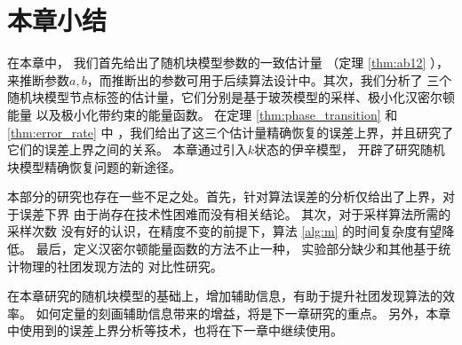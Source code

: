 

\section{本章小结}\label{sec:summary_potts}
在本章中， 
我们首先给出了随机块模型参数的一致估计量 （定理 \ref{thm:ab12} ），
来推断参数$a,b$，而推断出的参数可用于后续算法设计中。其次，我们分析了
三个随机块模型节点标签的估计量，它们分别是基于玻茨模型的采样、极小化汉密尔顿能量
以及极小化带约束的能量函数。
在定理 \ref{thm:phase_transition} 和 \ref{thm:error_rate} 中
，我们给出了这三个估计量精确恢复的误差上界，并且研究了它们的误差上界之间的关系。
本章通过引入$k$状态的伊辛模型，
开辟了研究随机块模型精确恢复问题的新途径。

本部分的研究也存在一些不足之处。首先，针对算法误差的分析仅给出了上界，对于误差下界
由于尚存在技术性困难而没有相关结论。
其次，对于采样算法所需的采样次数
没有好的认识，在精度不变的前提下，算法 \ref{alg:m} 的时间复杂度有望降低。
最后，定义汉密尔顿能量函数的方法不止一种，
实验部分缺少和其他基于统计物理的社团发现方法的
对比性研究。

在本章研究的随机块模型的基础上，增加辅助信息，有助于提升社团发现算法的效率。
如何定量的刻画辅助信息带来的增益，将是下一章研究的重点。
另外，本章中使用到的误差上界分析等技术，也将在下一章中继续使用。


